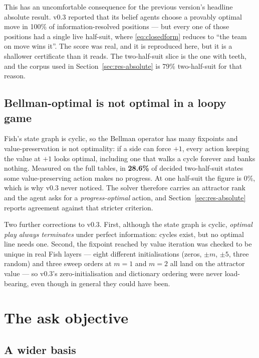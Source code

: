 \documentclass[11pt,a4paper]{article}
\begin{document}
This has an uncomfortable consequence for the previous version's headline
absolute result. v0.3 reported that its belief agents choose a provably optimal
move in 100\% of information-resolved positions --- but every one of those
positions had a single live half-suit, where \eqref{eq:closedform} reduces to
``the team on move wins it''. The score was real, and it is reproduced here, but
it is a shallower certificate than it reads. The two-half-suit slice is the one
with teeth, and the corpus used in Section~\ref{sec:res-absolute} is 79\%
two-half-suit for that reason.

\subsection{Bellman-optimal is not optimal in a loopy game}

Fish's state graph is cyclic, so the Bellman operator has many fixpoints and
value-preservation is not optimality: if a side can force $+1$, every action
keeping the value at $+1$ looks optimal, including one that walks a cycle
forever and banks nothing. Measured on the full tables, in \textbf{28.6\%} of
decided two-half-suit states some value-preserving action makes no progress. At
one half-suit the figure is $0\%$, which is why v0.3 never noticed. The solver
therefore carries an attractor rank and the agent asks for a
\emph{progress-optimal} action, and Section~\ref{sec:res-absolute} reports
agreement against that stricter criterion.

Two further corrections to v0.3. First, although the state graph is cyclic,
\emph{optimal play always terminates} under perfect information: cycles exist,
but no optimal line needs one. Second, the fixpoint reached by value iteration
was checked to be unique in real Fish layers --- eight different initialisations
(zeros, $\pm m$, $\pm 5$, three random) and three sweep orders at $m=1$ and
$m=2$ all land on the attractor value --- so v0.3's zero-initialisation and
dictionary ordering were never load-bearing, even though in general they could
have been.

\section{The ask objective}
\label{sec:objective}

\subsection{A wider basis}
\end{document}
